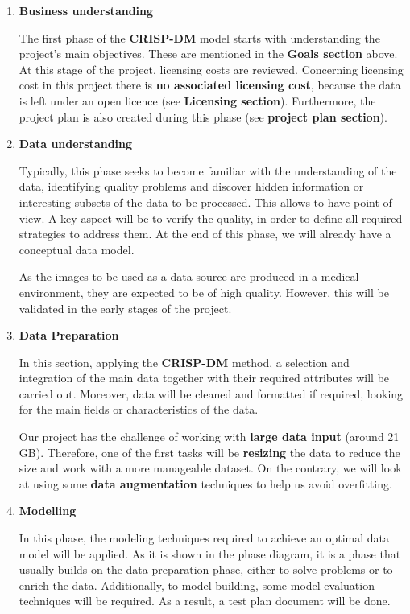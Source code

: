 \begin{enumerate}
    \item \textbf{Business understanding}
    
    The first phase of the \textbf{CRISP-DM} model starts with understanding the project's main objectives. These are mentioned in the \textbf{ Goals section} above. At this stage of the project, licensing costs are reviewed. Concerning licensing cost in this project there is \textbf{no associated licensing cost}, because the data is left under an open licence (see \textbf{Licensing section}). Furthermore, the project plan is also created during this phase (see \textbf{project plan section}).

    \item \textbf{Data understanding}
    
    Typically, this phase seeks to become familiar with the understanding of the data, identifying quality problems and discover hidden information or interesting subsets of the data to be processed. This allows to have point of view. A key aspect will be to verify the quality, in order to define all required strategies to address them. At the end of this phase, we will already have a conceptual data model.

    As the images to be used as a data source are produced in a medical environment, they are expected to be of high quality. However, this will be validated in the early stages of the project.

        
    \item \textbf{Data Preparation}

    In this section, applying the \textbf{CRISP-DM} method, a selection and integration of the main data together with their required attributes will be carried out. Moreover, data will be cleaned and formatted if required, looking for the main fields or characteristics of the data.

    Our project has the challenge of working with \textbf{large data input} (around 21 GB). Therefore, one of the first tasks will be \textbf{resizing} the data to reduce the size and work with a more manageable dataset. On the contrary, we will look at using some \textbf{data augmentation} techniques to help us avoid overfitting. 
    
    \item \textbf{Modelling}

    In this phase, the modeling techniques required to achieve an optimal data model will be applied. As it is shown in the phase diagram, it is a phase that usually builds on the data preparation phase, either to solve problems or to enrich the data. Additionally, to model building, some model evaluation techniques will be required. As a result, a test plan document will be done.


\end{enumerate}
